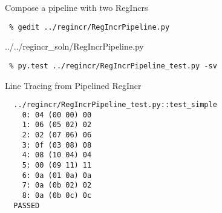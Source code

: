 \begin{task}\begin{frame}[fragile]{Compose a pipeline with two RegIncrs}

\vspace{-0.15in}
\begin{Verbatim}[commandchars=\\\{\}]
 % cd \midtilde/pymtl-tut/build
 % gedit ../regincr/RegIncrPipeline.py
\end{Verbatim}
\vspace{-0.2in}

%
{../../regincr_soln/RegIncrPipeline.py}

\vspace{-0.22in}
\begin{Verbatim}
 % py.test ../regincr/RegIncrPipeline_test.py -sv
\end{Verbatim}

\vspace{-2.35in}\hspace*{2.5in}

\end{frame}
\end{task}

\begin{frame}[fragile]{Line Tracing from Pipelined RegIncr}

\begin{Verbatim}
  ../regincr/RegIncrPipeline_test.py::test_simple
    0: 04 (00 00) 00
    1: 06 (05 02) 02
    2: 02 (07 06) 06
    3: 0f (03 08) 08
    4: 08 (10 04) 04
    5: 00 (09 11) 11
    6: 0a (01 0a) 0a
    7: 0a (0b 02) 02
    8: 0a (0b 0c) 0c
  PASSED
\end{Verbatim}

\end{frame}

